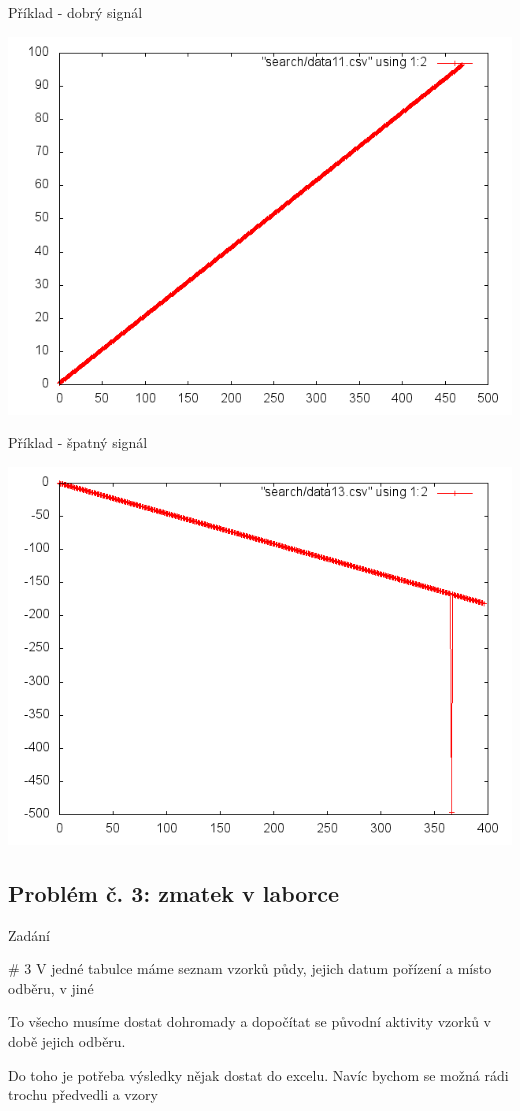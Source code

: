 \documentclass{beamer}
\begin{document}
\begin{frame}{Příklad - dobrý signál}
  \begin{center}
      \includegraphics[width=0.6\columnwidth]{search_good}
      \end{center}
\end{frame}
\begin{frame}{Příklad - špatný signál}
  \begin{center}
      \includegraphics[width=0.6\columnwidth]{search_bad}
      \end{center}
\end{frame}


\subsection{Problém č. 3: zmatek v laborce}

\begin{frame}{Zadání}
  \begin{block}{\# 3}
    V jedné tabulce máme seznam vzorků půdy, jejich datum pořízení a místo odběru, v jiné

    To všecho musíme dostat dohromady a dopočítat se původní aktivity vzorků v době jejich odběru.

    Do toho je potřeba výsledky nějak dostat do excelu. Navíc bychom se možná rádi trochu předvedli a vzory
  \end{block}
\end{frame}
\end{document}
